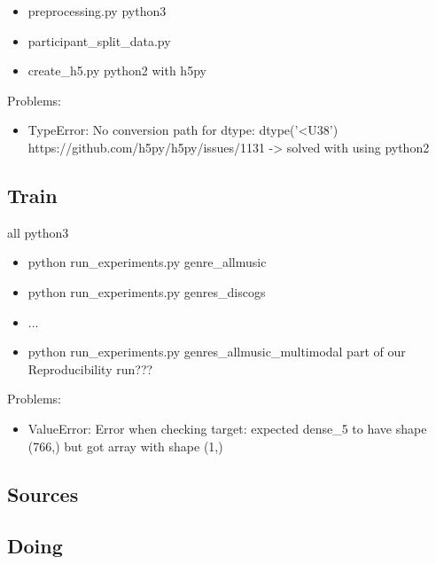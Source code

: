 \documentclass[sigconf,nonacm]{acmart}
\begin{document}
  \begin{itemize}
    \item preprocessing.py python3
    \item participant\_split\_data.py
    \item create\_h5.py python2 with h5py
  \end{itemize}

  Problems:
  \begin{itemize}
    \item TypeError: No conversion path for dtype: dtype('<U38') https://github.com/h5py/h5py/issues/1131 -> solved with using python2
  \end{itemize}

\subsection{Train}

all python3

\begin{itemize}
  \item python run\_experiments.py genre_allmusic
  \item python run\_experiments.py genres_discogs
  \item ... 
  \item python run\_experiments.py genres_allmusic_multimodal part of our Reproducibility run???
\end{itemize}

Problems:
\begin{itemize}
  \item ValueError: Error when checking target: expected dense\_5 to have shape (766,) but got array with shape (1,)
\end{itemize}

\subsection{Sources}

\subsection{Doing}






\end{document}
